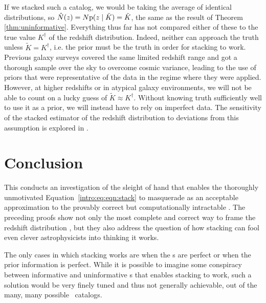 If we stacked such a catalog, we would be taking the average of identical distributions, so $\hat{N}(z) = N \mathrm{p}(z \mid \tilde{K}) = \tilde{K}$, the same as the result of Theorem \ref{thm:uninformative}.
Everything thus far has not compared either of these to the true value $K^{\dagger}$ of the redshift distribution.
Indeed, neither can approach the truth unless $\tilde{K} = K^{\dagger}$, i.e. the prior must be the truth in order for stacking to work.
Previous galaxy surveys covered the same limited redshift range and got a thorough sample over the sky to overcome cosmic variance, leading to the use of priors that were representative of the data in the regime where they were applied.
However, at higher redshifts or in atypical galaxy environments, we will not be able to count on a lucky guess of $\tilde{K} \approx K^{\dagger}$.
Without knowing truth sufficiently well to use it as a prior, we will instead have to rely on imperfect data.
The sensitivity of the stacked estimator of the redshift distribution to deviations from this assumption is explored in .

\section{Conclusion}


This \paper conducts an investigation of the sleight of hand that enables the thoroughly unmotivated Equation~\ref{intro:eq:eqn:stack} to masquerade as an acceptable approximation to the provably correct but computationally intractable .
The preceding proofs show not only the most complete and correct way to frame the redshift distribution \Nz, but they also address the question of how stacking can fool even clever astrophysicists into thinking it works.

The only cases in which stacking works are when the \pzpdf s are perfect or when the prior information is perfect.
While it is possible to imagine some conspiracy between informative and uninformative \pzpdf s that enables stacking to work, such a solution would be very finely tuned and thus not generally achievable, out of the many, many possible \pzpdf\ catalogs.

